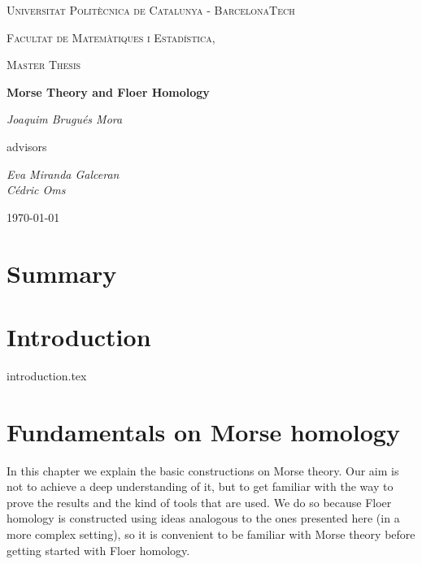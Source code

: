 \documentclass[a4paper,11pt]{book}
\begin{document}
\begin{titlepage}
	\centering
	{\scshape\LARGE Universitat Politècnica de Catalunya - BarcelonaTech\par}
	{\scshape\LARGE Facultat de Matemàtiques i Estadística, \par}
	\vspace{1cm}
	{\scshape\Large Master Thesis\par}
	\vspace{1.5cm}
	{\huge\bfseries Morse Theory and Floer Homology\par}
	\vspace{2cm}
	{\Large\itshape Joaquim Brugués Mora\par}
	\vfill
	advisors\par
	{\Large\itshape Eva Miranda Galceran \\ Cédric Oms \par}

	\vfill

	{\large \today\par}
\end{titlepage}


\chapter*{Summary}


\tableofcontents

\mainmatter

\chapter*{Introduction}
{introduction.tex}

\chapter{Fundamentals on Morse homology}
In this chapter we explain the basic constructions on Morse theory. Our aim is not to achieve a deep understanding of it, but to get familiar with the way to prove the results and the kind of tools that are used. We do so because Floer homology is constructed using ideas analogous to the ones presented here (in a more complex setting), so it is convenient to be familiar with Morse theory before getting started with Floer homology.
\end{document}
